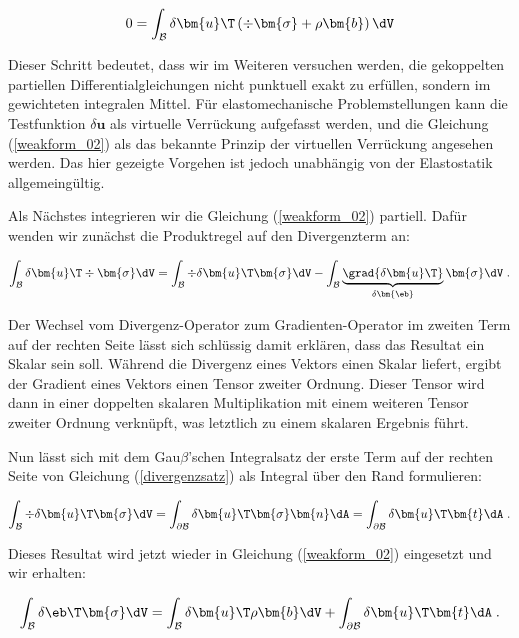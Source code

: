\begin{equation}
\label{weakform_02}
0 = \int_{\mathcal{B}} \delta  \bm{u}\T \left(\div{\bm{\sigma}} + \rho \bm{b} \right) \dV
\end{equation}

Dieser Schritt bedeutet, dass wir im Weiteren versuchen werden, die gekoppelten partiellen Differentialgleichungen nicht punktuell exakt zu erfüllen, sondern im gewichteten integralen Mittel. Für elastomechanische Problemstellungen kann die Testfunktion $\delta \bm{u}$ als virtuelle Verrückung aufgefasst werden, und die Gleichung (\ref{weakform_02}) als das bekannte Prinzip der virtuellen Verrückung angesehen werden. Das hier gezeigte Vorgehen ist jedoch unabhängig von der Elastostatik allgemeingültig.

Als Nächstes integrieren wir die Gleichung (\ref{weakform_02}) partiell. Dafür wenden wir zunächst die Produktregel auf den Divergenzterm an:

\begin{equation}
\label{divergenzsatz}
\int_{\mathcal{B}} \delta \bm{u}\T \div{\bm{\sigma}} \dV = \int_{\mathcal{B}} \div{\delta \bm{u}\T \bm{\sigma}} \dV -\int_{\mathcal{B}} \underbrace{\grad{\delta\bm{u}\T}}_{\delta \bm{\eb}}\bm{\sigma} \dV \; .
\end{equation}

Der Wechsel vom Divergenz-Operator zum Gradienten-Operator im zweiten Term auf der rechten Seite lässt sich schlüssig damit erklären, dass das Resultat ein Skalar sein soll. Während die Divergenz eines Vektors einen Skalar liefert, ergibt der Gradient eines Vektors einen Tensor zweiter Ordnung. Dieser Tensor wird dann in einer doppelten skalaren Multiplikation mit einem weiteren Tensor zweiter Ordnung verknüpft, was letztlich zu einem skalaren Ergebnis führt.

Nun lässt sich mit dem Gau$\beta$'schen Integralsatz der erste Term auf der rechten Seite von Gleichung (\ref{divergenzsatz}) als Integral über den Rand formulieren:

\begin{equation}
\label{gaussIntegralTheorem}
\int_{\mathcal{B}} \div{\delta \bm{u}\T  \bm{\sigma}} \dV = \int_{\partial\mathcal{B}} \delta \bm{u}\T \bm{\sigma}  \bm{n} \dA = \int_{\partial\mathcal{B}} \delta \bm{u}\T \bm{t} \dA \; .
\end{equation}

Dieses Resultat wird jetzt wieder in Gleichung (\ref{weakform_02}) eingesetzt und wir erhalten:

\begin{equation}
\label{weakform_03}
\int_{\mathcal{B}} \delta\eb\T  \bm{\sigma} \dV = \int_{\mathcal{B}} \delta \bm{u}\T \rho \bm{b} \dV + \int_{\partial\mathcal{B}} \delta \bm{u}\T  \bm{t} \dA \; .
\end{equation}

